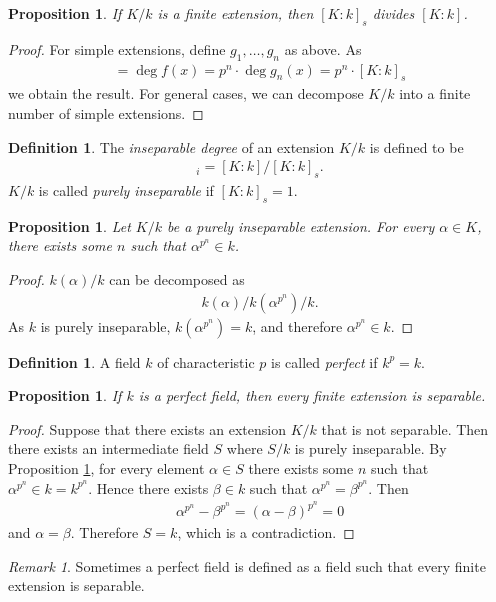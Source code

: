 \documentclass[12pt]{report}
\theoremstyle{plain}
\newtheorem{proposition}[theorem]{Proposition}
\theoremstyle{remark}
\newtheorem*{remark}{Remark}
\theoremstyle{definition}
\newtheorem{definition}[theorem]{Definition}
\begin{document}
\begin{proposition}
    If $K/k$ is a finite extension, then $[K:k]_s$ divides $[K:k]$.
\end{proposition}
\begin{proof}
    For simple extensions, define $g_1,\dots,g_n$ as above. As
    \begin{align*}
        [K:k]=\deg f(x) = p^n \cdot \deg g_n(x) = p^n \cdot [K:k]_s
    \end{align*}
    we obtain the result. For general cases, we can decompose $K/k$ into a finite number of simple extensions.
\end{proof}

\begin{definition}
    The \emph{inseparable degree} of an extension $K/k$ is defined to be
    \begin{align*}
        [K:k]_i = [K:k]/[K:k]_s.
    \end{align*}
    $K/k$ is called \emph{purely inseparable} if $[K:k]_s=1$.
\end{definition}

\begin{proposition}\label{Proposition 3.10.5.}
    Let $K/k$ be a purely inseparable extension. For every $\alpha\in K$, there exists some $n$ such that $\alpha^{p^n}\in k$.
\end{proposition}
\begin{proof}
    $k(\alpha)/k$ can be decomposed as
    \begin{align*}
        k(\alpha)/k(\alpha^{p^n})/k.
    \end{align*}
    As $k$ is purely inseparable, $k(\alpha^{p^n})=k$, and therefore $\alpha^{p^n}\in k$.
\end{proof}

\begin{definition}
    A field $k$ of characteristic $p$ is called \emph{perfect} if $k^p=k$.
\end{definition}

\begin{proposition}
    If $k$ is a perfect field, then every finite extension is separable.
\end{proposition}
\begin{proof}
    Suppose that there exists an extension $K/k$ that is not separable. Then there exists an intermediate field $S$ where $S/k$ is purely inseparable. By Proposition \ref{Proposition 3.10.5.}, for every element $\alpha\in S$ there exists some $n$ such that $\alpha^{p^n}\in k = k^{p^n}$. Hence there exists $\beta\in k$ such that $\alpha^{p^n}=\beta^{p^n}$. Then
    \begin{align*}
        \alpha^{p^n}-\beta^{p^n} = (\alpha-\beta)^{p^n} = 0
    \end{align*}
    and $\alpha=\beta$. Therefore $S=k$, which is a contradiction.
\end{proof}
\begin{remark}
    Sometimes a perfect field is defined as a field such that every finite extension is separable.
\end{remark}
\end{document}
